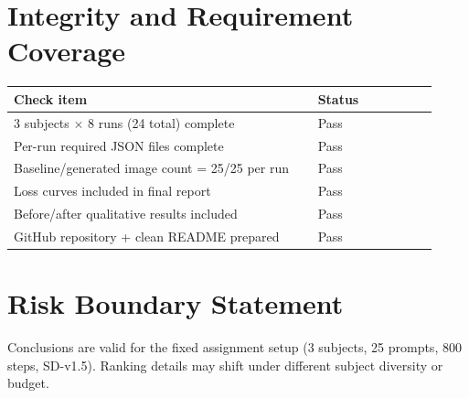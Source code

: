 \documentclass[10pt]{article}
\begin{document}
\section*{Integrity and Requirement Coverage}
\begin{tabular}{@{}p{0.66\linewidth}p{0.26\linewidth}@{}}
\toprule
Check item & Status \\
\midrule
3 subjects $\times$ 8 runs (24 total) complete & Pass \\
Per-run required JSON files complete & Pass \\
Baseline/generated image count = 25/25 per run & Pass \\
Loss curves included in final report & Pass \\
Before/after qualitative results included & Pass \\
GitHub repository + clean README prepared & Pass \\
\bottomrule
\end{tabular}

\section*{Risk Boundary Statement}
Conclusions are valid for the fixed assignment setup (3 subjects, 25 prompts, 800 steps, SD-v1.5). Ranking details may shift under different subject diversity or budget.
\end{document}
